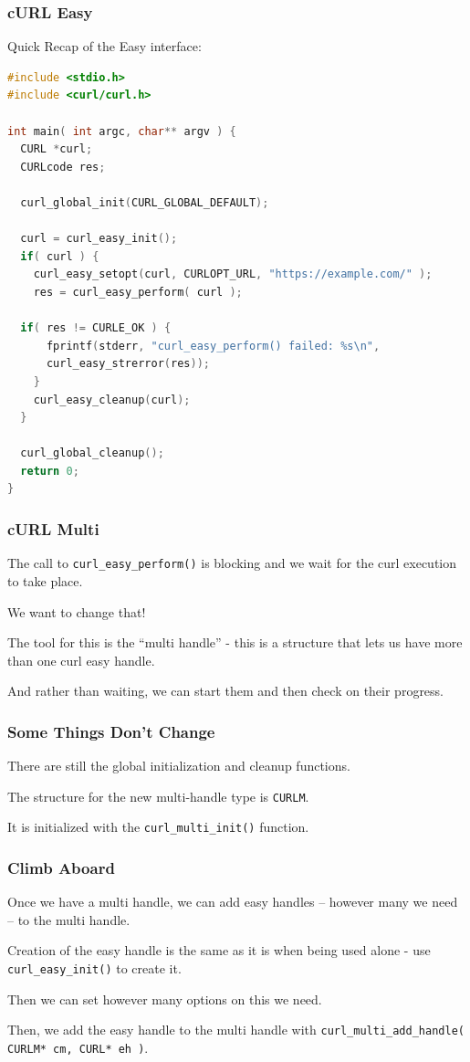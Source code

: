 \begin{frame}[fragile]
\frametitle{cURL Easy}

Quick Recap of the Easy interface:

\begin{lstlisting}[language=C]
#include <stdio.h>
#include <curl/curl.h>
 
int main( int argc, char** argv ) {
  CURL *curl;
  CURLcode res;
 
  curl_global_init(CURL_GLOBAL_DEFAULT);
 
  curl = curl_easy_init();
  if( curl ) {
    curl_easy_setopt(curl, CURLOPT_URL, "https://example.com/" );
    res = curl_easy_perform( curl );
    
  if( res != CURLE_OK ) {
      fprintf(stderr, "curl_easy_perform() failed: %s\n", 
      curl_easy_strerror(res));
    }
    curl_easy_cleanup(curl);
  }
 
  curl_global_cleanup();
  return 0;
}
\end{lstlisting}


\end{frame}

\begin{frame}
\frametitle{cURL Multi}

The call to \texttt{curl\_easy\_perform()} is blocking and we wait for the curl execution to take place. 

We want to change that! 

The tool for this is the ``multi handle'' - this is a structure that lets us have more than one curl easy handle. 

And rather than waiting, we can start them and then check on their progress. 

\end{frame}


\begin{frame}
\frametitle{Some Things Don't Change}

There are still the global initialization and cleanup functions. 

The structure for the new multi-handle type is \texttt{CURLM}.

It is initialized with the \texttt{curl\_multi\_init()} function. 

\end{frame}


\begin{frame}
\frametitle{Climb Aboard}

Once we have a multi handle, we can add easy handles -- however many we need -- to the multi handle. 

Creation of the easy handle is the same as it is when being used alone - use \texttt{curl\_easy\_init()} to create it.

Then we can set however many options on this we need. 

Then, we add the easy handle to the multi handle with \texttt{curl\_multi\_add\_handle( CURLM* cm, CURL* eh )}.


\end{frame}

